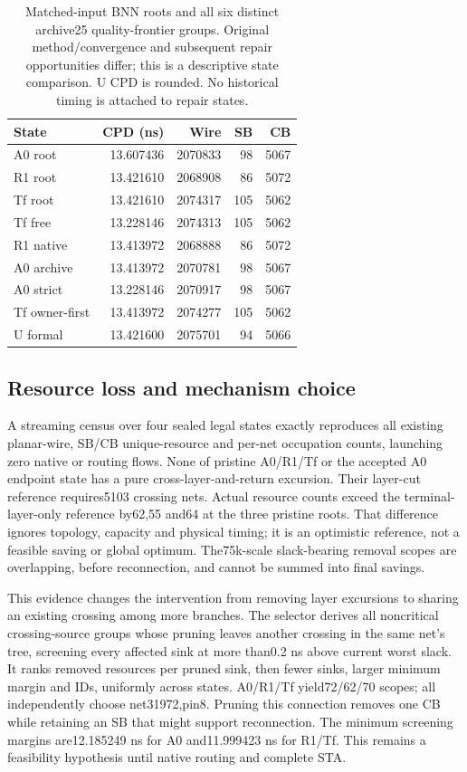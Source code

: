\begin{table}[t]
\centering\small
\caption{Matched-input BNN roots and all six distinct archive25 quality-frontier groups. Original method/convergence and subsequent repair opportunities differ; this is a descriptive state comparison. U CPD is rounded. No historical timing is attached to repair states.}
\begin{tabular}{lrrrr}
\hline
State & CPD (ns) & Wire & SB & CB\\
\hline
A0 root & 13.607436 & 2070833 & 98 & 5067\\
R1 root & 13.421610 & 2068908 & 86 & 5072\\
Tf root & 13.421610 & 2074317 & 105 & 5062\\
Tf free & 13.228146 & 2074313 & 105 & 5062\\
R1 native & 13.413972 & 2068888 & 86 & 5072\\
A0 archive & 13.413972 & 2070781 & 98 & 5067\\
A0 strict & 13.228146 & 2070917 & 98 & 5067\\
Tf owner-first & 13.413972 & 2074277 & 105 & 5062\\
U formal & 13.421600 & 2075701 & 94 & 5066\\
\hline
\end{tabular}
\end{table}

\subsection{Resource loss and mechanism choice}
A streaming census over four sealed legal states exactly reproduces all existing planar-wire, SB/CB unique-resource and per-net occupation counts, launching zero native or routing flows. None of pristine A0/R1/Tf or the accepted A0 endpoint state has a pure cross-layer-and-return excursion. Their layer-cut reference requires5103 crossing nets. Actual resource counts exceed the terminal-layer-only reference by62,55 and64 at the three pristine roots. That difference ignores topology, capacity and physical timing; it is an optimistic reference, not a feasible saving or global optimum. The75k-scale slack-bearing removal scopes are overlapping, before reconnection, and cannot be summed into final savings.

This evidence changes the intervention from removing layer excursions to sharing an existing crossing among more branches. The selector derives all noncritical crossing-source groups whose pruning leaves another crossing in the same net's tree, screening every affected sink at more than0.2 ns above current worst slack. It ranks removed resources per pruned sink, then fewer sinks, larger minimum margin and IDs, uniformly across states. A0/R1/Tf yield72/62/70 scopes; all independently choose net31972,pin8. Pruning this connection removes one CB while retaining an SB that might support reconnection. The minimum screening margins are12.185249 ns for A0 and11.999423 ns for R1/Tf. This remains a feasibility hypothesis until native routing and complete STA.

